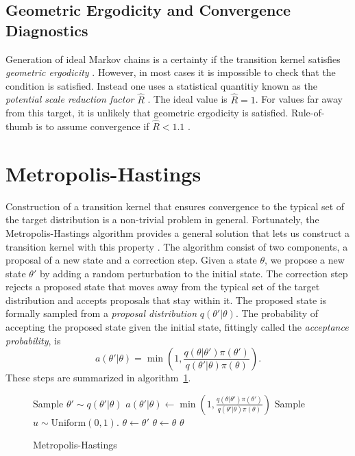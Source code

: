 \subsection{Geometric Ergodicity and Convergence Diagnostics}
Generation of ideal Markov chains is a certainty if the transition kernel satisfies \textit{geometric ergodicity} \cite{geometric_ergodicity}.
However, in most cases it is impossible to check that the condition is satisfied. Instead one uses a statistical quantitiy known
as the \textit{potential scale reduction factor} $\hat{R}$ \cite{rhat}. The ideal value is $\hat{R} = 1$. For values far away from this target,
it is unlikely that geometric ergodicity is satisfied. Rule-of-thumb is to assume convergence
if $\hat{R} < 1.1$ \cite{convergence_diagnostics}.



\section{Metropolis-Hastings}
Construction of a transition kernel that ensures convergence to the typical set of the target distribution is a non-trivial problem in general.
Fortunately, the Metropolis-Hastings algorithm provides a general solution that lets us construct 
a transition kernel with this property \cite{metropolis,metropolis_two}. 
The algorithm consist of two components, a proposal of a new state and a correction step.
Given a state $\theta$, we propose a new state $\theta'$ by adding a random perturbation to the initial state.
The correction step rejects a proposed state that moves away from the typical set of the target distribution
and accepts proposals that stay within it.
The proposed state is formally sampled from a \textit{proposal distribution} $q(\theta'|\theta)$.
The probability of accepting the proposed state given the initial state, fittingly called the \textit{acceptance probability}, is 
\begin{equation}\label{eq:general_acceptance_prob}
    a(\theta'|\theta) = \min \left(1, \frac{q(\theta|\theta')\pi(\theta')}{q(\theta'|\theta)\pi (\theta)}\right).
\end{equation}
These steps are summarized in algorithm~\ref{algo:general_metropolis}.
\begin{figure}[H]
    \begin{algorithm}[H]
      \caption{Metropolis-Hastings}\label{algo:general_metropolis}
      \begin{algorithmic}
        \State Sample $\theta' \sim q(\theta'|\theta)$
        \State $\displaystyle{a(\theta'|\theta) \leftarrow \min \left(1, \frac{q(\theta|\theta')\pi(\theta')}{q(\theta'|\theta)\pi (\theta)}\right)}$
        \State Sample $u \sim \text{Uniform}(0,1)$.
          \State $\theta \leftarrow \theta'$ 
        \Else
          \State $\theta \leftarrow \theta$  
        \EndIf 
        \State \Return $\theta$
        \EndFunction
      \end{algorithmic}
    \end{algorithm}
  \end{figure}

